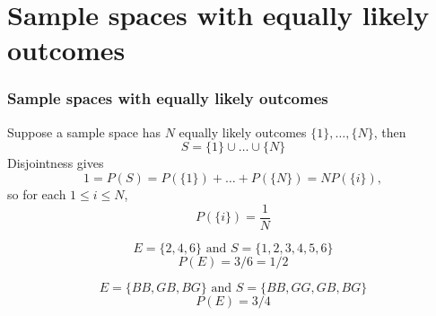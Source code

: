 \documentclass[slidestop,compress,mathserif]{beamer}
\begin{document}




\section{Sample spaces with equally likely outcomes}
\begin{frame}\frametitle{Sample spaces with equally likely outcomes}
\begin{dinglist}{\DingListSymbolA}
\item Suppose a sample space has $N$ equally likely outcomes $\{1\}, \ldots, \{N\}$, then
\[
S = \{1\} \cup \ldots \cup \{N\}
\]
Disjointness gives
\[
1 = P(S) = P(\{1\}) + \ldots + P(\{N\}) = NP(\{i\}),
\]
so for each $1\leq i \leq N$,
\[
P(\{i\}) = \frac{1}{N}
\]

\end{dinglist}
\end{frame}



\begin{frame}%
\vfill
{}
\pause
\[ E = \{2,4,6\} \text{ and } S = \{1,2,3,4,5,6\}\]
\[P(E) = 3/6 = 1/2\]

\pause
{}
\pause
\[ E = \{ BB, GB, BG \}  \text{ and } S = \{ BB, GG, GB, BG \} \]
\[P(E) = 3/4 \]


\end{frame}



\end{document}
